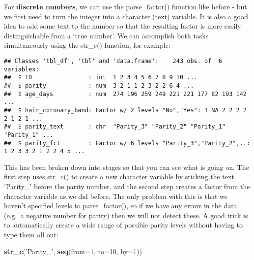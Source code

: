\documentclass[
]{article}
\newenvironment{Shaded}{\begin{snugshade}}{\end{snugshade}}
\newcommand{\DataTypeTok}[1]{\textcolor[rgb]{0.13,0.29,0.53}{#1}}
\newcommand{\DecValTok}[1]{\textcolor[rgb]{0.00,0.00,0.81}{#1}}
\newcommand{\KeywordTok}[1]{\textcolor[rgb]{0.13,0.29,0.53}{\textbf{#1}}}
\newcommand{\NormalTok}[1]{#1}
\newcommand{\OperatorTok}[1]{\textcolor[rgb]{0.81,0.36,0.00}{\textbf{#1}}}
\newcommand{\StringTok}[1]{\textcolor[rgb]{0.31,0.60,0.02}{#1}}
\begin{document}
For \textbf{discrete numbers}, we can use the parse\_factor() function
like before - but we first need to turn the integer into a character
(text) variable. It is also a good idea to add some text to the number
so that the resulting factor is more easily distinguishable from a `true
number'. We can accomplish both tasks simultaneously using the str\_c()
function, for example:

\begin{Shaded}
\end{Shaded}

\begin{verbatim}
## Classes 'tbl_df', 'tbl' and 'data.frame':    243 obs. of  6 variables:
##  $ ID                : int  1 2 3 4 5 6 7 8 9 10 ...
##  $ parity            : num  3 2 1 1 2 3 2 2 6 4 ...
##  $ age_days          : num  274 196 259 249 221 221 177 82 193 142 ...
##  $ hair_coronary_band: Factor w/ 2 levels "No","Yes": 1 NA 2 2 2 2 2 1 2 1 ...
##  $ parity_text       : chr  "Parity_3" "Parity_2" "Parity_1" "Parity_1" ...
##  $ parity_fct        : Factor w/ 6 levels "Parity_3","Parity_2",..: 1 2 3 3 2 1 2 2 4 5 ...
\end{verbatim}

This has been broken down into stages so that you can see what is going
on. The first step uses str\_c() to create a new character variable by
sticking the text `Parity\_' before the parity number, and the second
step creates a factor from the character variable as we did before. The
only problem with this is that we haven't specified levels to
parse\_factor(), so if we have any errors in the data (e.g.~a negative
number for parity) then we will not detect these. A good trick is to
automatically create a wide range of possible parity levels without
having to type them all out:

\begin{Shaded}
\begin{Highlighting}[]
\KeywordTok{str_c}\NormalTok{(}\StringTok{'Parity_'}\NormalTok{, }\KeywordTok{seq}\NormalTok{(}\DataTypeTok{from=}\DecValTok{1}\NormalTok{, }\DataTypeTok{to=}\DecValTok{10}\NormalTok{, }\DataTypeTok{by=}\DecValTok{1}\NormalTok{))}
\end{Highlighting}
\end{Shaded}
\end{document}
